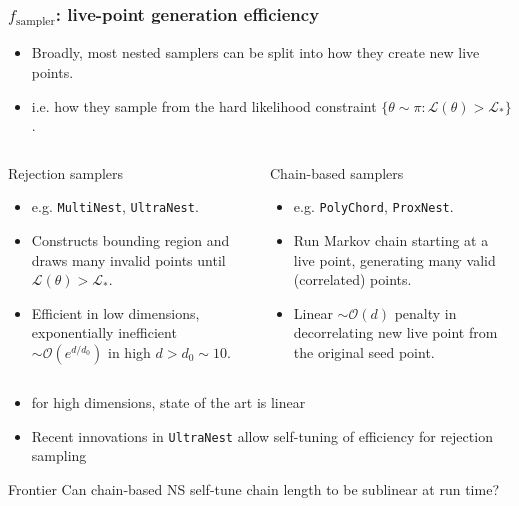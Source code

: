 \documentclass[aspectratio=169]{beamer}
\begin{document}
\begin{frame}
    \frametitle{$f_\text{sampler}$: live-point generation efficiency}
    \begin{itemize}
        \item Broadly, most nested samplers can be split into how they create new live points.
        \item i.e. how they sample from the hard likelihood constraint $\{\theta\sim \pi : \mathcal{L}(\theta)>\mathcal{L}_* \}$.
    \end{itemize}
    \vspace{-10pt}
    \begin{columns}[t]
        \begin{block}{Rejection samplers}
            \begin{itemize}
                \item e.g. \texttt{MultiNest}, \texttt{UltraNest}.
                \item Constructs bounding region and draws many invalid points until $\mathcal{L}(\theta)>\mathcal{L}_*$.
                \item Efficient in low dimensions, exponentially inefficient $\sim\mathcal{O}(e^{d/d_0})$ in high  $d>d_0\sim10$.
            \end{itemize}
        \end{block}
        \begin{block}{Chain-based samplers}
            \begin{itemize}
                \item e.g. \texttt{PolyChord}, \texttt{ProxNest}.
                \item Run Markov chain starting at a live point, generating many valid (correlated) points.
                \item Linear $\sim\mathcal{O}(d)$ penalty in decorrelating new live point from the original seed point.
            \end{itemize}
        \end{block}
    \end{columns}
    \vspace{5pt}
    \begin{itemize}
        \item for high dimensions, state of the art is linear
        \item Recent innovations in \texttt{UltraNest} allow self-tuning of efficiency for rejection sampling
    \end{itemize}
    \begin{alertblock}{Frontier}
        Can chain-based NS self-tune chain length to be sublinear at run time?
    \end{alertblock}
\end{frame}
\end{document}
